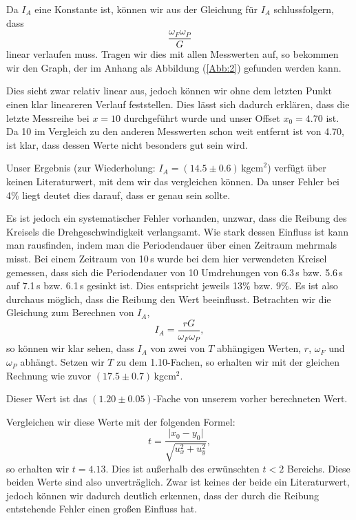 \documentclass[11pt,a4paper]{article}
\begin{document}

Da $I_A$ eine Konstante ist, k\"onnen wir aus der Gleichung f\"ur $I_A$ schlussfolgern, dass
\[\frac{\omega_F\omega_P}{G}\]
linear verlaufen muss. Tragen wir dies mit allen Messwerten auf, so bekommen wir den Graph, der im Anhang als Abbildung (\ref{Abb:2}) gefunden werden kann.

Dies sieht zwar relativ linear aus, jedoch k\"onnen wir ohne dem letzten Punkt einen klar lineareren Verlauf feststellen. Dies l\"asst sich dadurch erkl\"aren, dass die letzte Messreihe bei $x=10$ durchgef\"uhrt wurde und unser Offset $x_0=4.70$ ist. Da 10 im Vergleich zu den anderen Messwerten schon weit entfernt ist von 4.70, ist klar, dass dessen Werte nicht besonders gut sein wird.

Unser Ergebnis (zur Wiederholung: $I_A=(14.5\pm0.6)\,\mathrm{kgcm}^2$) verf\"ugt \"uber keinen Literaturwert, mit dem wir das vergleichen k\"onnen. Da unser Fehler bei 4\% liegt deutet dies darauf, dass er genau sein sollte.

Es ist jedoch ein systematischer Fehler vorhanden, unzwar, dass die Reibung des Kreisels die Drehgeschwindigkeit verlangsamt. Wie stark dessen Einfluss ist kann man rausfinden, indem man die Periodendauer \"uber einen Zeitraum mehrmals misst. 
Bei einem Zeitraum von 10\,s wurde bei dem hier verwendeten Kreisel gemessen, dass sich die Periodendauer von 10 Umdrehungen von 6.3\,s bzw. 5.6\,s auf 7.1\,s bzw. 6.1\,s gesinkt ist. Dies entspricht jeweils 13\% bzw. 9\%. Es ist also durchaus m\"oglich, dass die Reibung den Wert beeinflusst. Betrachten wir die Gleichung zum Berechnen von $I_A$,
\[
I_A=\frac{rG}{\omega_F\omega_P},
\]
so k\"onnen wir klar sehen, dass $I_A$ von zwei von $T$ abh\"angigen Werten, $r$, $\omega_F$ und $\omega_P$ abh\"angt. Setzen wir $T$ zu dem 1.10-Fachen, so erhalten wir mit der gleichen Rechnung wie zuvor $(17.5\pm0.7)$\,kgcm$^{2}$.

Dieser Wert ist das $(1.20\pm0.05)$-Fache von unserem vorher berechneten Wert.

Vergleichen wir diese Werte mit der folgenden Formel:
\begin{equation}
t=\frac{\vert x_0-y_0\vert}{\sqrt{u_x^2+u_y^2}},\label{abw}
\end{equation}
so erhalten wir $t=4.13$. Dies ist au\ss erhalb des erw\"unschten $t<2$ Bereichs. Diese beiden Werte sind also unvertr\"aglich. Zwar ist keines der beide ein Literaturwert, jedoch k\"onnen wir dadurch deutlich erkennen, dass der durch die Reibung entstehende Fehler einen gro\ss en Einfluss hat.
\end{document}
